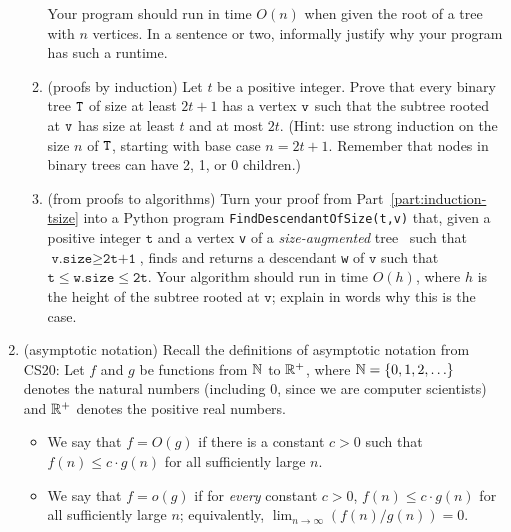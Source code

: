 \documentclass[11pt]{article}
\begin{document}
\begin{enumerate}
\begin{enumerate}
 Your program should run in time $O(n)$ when given the root of a tree with $n$ vertices. In a sentence or two, informally justify why your program has such a runtime. 



    \ifsolutions { \color{blue}
    } \fi

    \item (proofs by induction) Let $t$ be a positive integer. Prove that every binary tree $\texttt{T}$ of size at least $2t+1$ has a vertex $\texttt{v}$ such that the subtree rooted at $\texttt{v}$ has size at least $t$ and at most $2t$.  (Hint: use strong induction on the size $n$ of $\texttt{T}$, starting with base case $n=2t+1$.  Remember that nodes in binary trees can have 2, 1, or 0 children.) \label{part:induction-tsize}
    
    \solution{
    }

    
    
    \item (from proofs to algorithms) Turn your proof from Part~\ref{part:induction-tsize} into a Python program \texttt{FindDescendantOfSize(t,v)} that, given a positive integer $\texttt{t}$ and a vertex \texttt{v} of a {\em size-augmented} tree \treeT\ such that $\texttt{v.size}\geq \texttt{2t+1}$, finds and returns a descendant  \texttt{w} of $\texttt{v}$ such that $\texttt{t}\leq \texttt{w.size} \leq \texttt{2t}$.  Your algorithm should run in time $O(h)$, where $h$ is the height of the subtree rooted at $\texttt{v}$; explain in words why this is the case.
    


    \ifsolutions{\color{blue}
    }\fi
    
\end{enumerate}
 

\item (asymptotic notation) Recall the definitions of asymptotic notation from CS20:
Let $f$ and $g$ be functions from $\mathbb{N}$ to $\mathbb{R}^+$, where $\mathbb{N}=\{0,1,2,\ldots\}$ denotes the natural numbers (including 0, since we are computer scientists) and $\mathbb{R}^+$ denotes the positive real numbers.  
\begin{itemize}
    \item We say that $f=O(g)$ if there is a constant $c>0$ such that $f(n)\leq c\cdot g(n)$ for all sufficiently large $n$. 
    \item We say that $f=o(g)$ if for {\em every} constant $c>0$, $f(n)\leq c\cdot g(n)$ for all sufficiently large $n$; equivalently, $\lim_{n\rightarrow \infty} (f(n)/g(n))=0$.
\end{itemize}



\end{enumerate}
\end{document}
